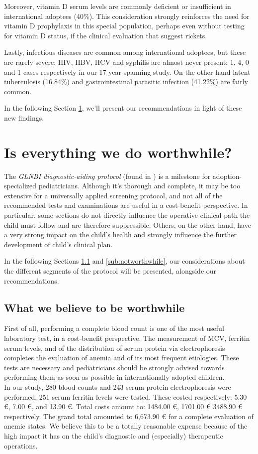 Moreover, vitamin D serum levels are commonly deficient or insufficient in international adoptees (40\%). This consideration strongly reinforces the need for vitamin D prophylaxis  in this special population, perhaps even without testing for vitamin D status, if the clinical evaluation that suggest rickets.

Lastly, infectious diseases are common among international adoptees, but these are rarely severe: HIV, HBV, HCV and syphilis are almost never present: 1, 4, 0 and 1 cases respectively in our 17-year-spanning study. On the other hand latent tuberculosis (16.84\%) and gastrointestinal parasitic infection (41.22\%) are fairly common.

In the following Section \ref{sec:worthwhile?}, we'll present our recommendations in light of these new findings.

\section{Is everything we do worthwhile?}\label{sec:worthwhile?}
The \textit{GLNBI diagnostic-aiding protocol} (found in \cite{GNLBI2}) is a milestone for adoption-specialized pediatricians. Although it's thorough and complete, it may be too extensive for a universally applied screening protocol, and not all of the recommended tests and examinations are useful in a cost-benefit perspective. In particular, some sections do not directly influence the operative clinical path the child must follow and are therefore suppressible. Others, on the other hand, have a very strong impact on the child's health and strongly influence the further development of child's clinical plan.

In the following Sections \ref{sub:worthwhile} and \ref{sub:notworthwhile}, our considerations about the different segments of the protocol will be presented, alongside our recommendations.

\subsection{What we believe to be worthwhile}\label{sub:worthwhile}
First of all, performing a complete blood count is one of the most useful laboratory test, in a cost-benefit perspective. The measurement of MCV, ferritin serum levels, and of the distribution of serum protein via electrophoresis completes the evaluation of anemia and of its most frequent etiologies. These tests are necessary and pediatricians should be strongly advised towards performing them as soon as possible in internationally adopted children.\\
In our study, 280 blood counts and 243 serum protein electrophoresis were performed, 251 serum ferritin levels were tested. These costed respectively: 5.30 €, 7.00 €, and 13.90 €. Total costs amount to: 1484.00 €, 1701.00 € 3488.90 € respectively. The grand total amounted to 6,673.90 € for a complete evaluation of anemic states. We believe this to be a totally reasonable expense because of the high impact it has on the child's diagnostic and (especially) therapeutic operations.

